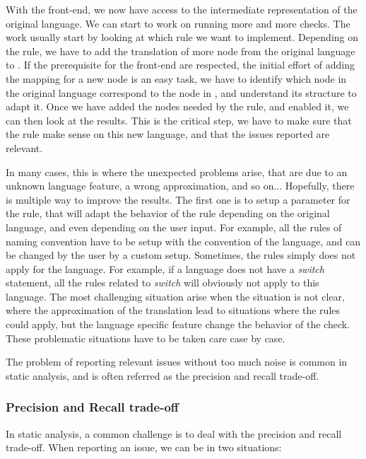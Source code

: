 With the front-end, we now have access to the intermediate representation of the original language. 
We can start to work on running more and more checks. 
The work usually start by looking at which rule we want to implement. 
Depending on the rule, we have to add the translation of more node from the original language to \slang{}. 
If the prerequisite for the front-end are respected, the initial effort of adding the mapping for a new node is an easy task, we have to identify which node in the original language correspond to the node in \slang{}, and understand its structure to adapt it. 
Once we have added the nodes needed by the rule, and enabled it, we can then look at the results. 
This is the critical step, we have to make sure that the rule make sense on this new language, and that the issues reported are relevant. 

In many cases, this is where the unexpected problems arise, that are due to an unknown language feature, a wrong approximation, and so on...
Hopefully, there is multiple way to improve the results. 
The first one is to setup a parameter for the rule, that will adapt the behavior of the rule depending on the original language, and even depending on the user input.
For example, all the rules of naming convention have to be setup with the convention of the language, and can be changed by the user by a custom setup. 
Sometimes, the rules simply does not apply for the language. 
For example, if a language does not have a \emph{switch} statement, all the rules related to \emph{switch} will obviously not apply to this language.
The most challenging situation arise when the situation is not clear, where the approximation of the translation lead to situations where the rules could apply, but the language specific feature change the behavior of the check. 
These problematic situations have to be taken care case by case.

The problem of reporting relevant issues without too much noise is common in static analysis, and is often referred as the precision and recall trade-off.

\subsubsection{Precision and Recall trade-off}
\label{subsubsec:precision_recall}

In static analysis, a common challenge is to deal with the precision and recall trade-off. When reporting an issue, we can be in two situations:


